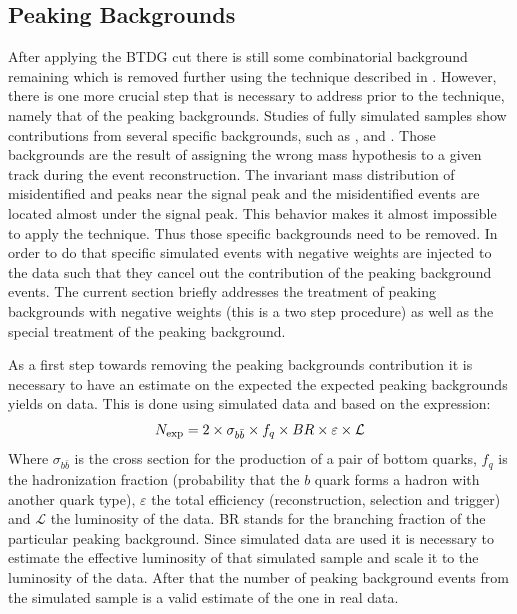 \subsection{Peaking Backgrounds}
\label{peaking_backgrounds}

After applying the BTDG cut there is still some combinatorial background remaining which is removed
further using the \sPlot technique described in . However, there is
one more crucial step that is necessary to address prior to the \sPlot technique, namely that of the peaking backgrounds.
Studies of fully simulated samples show contributions from several specific backgrounds, such as \BsJpsiKK, \BsJpsipipi and \BdJpsipipi.
Those backgrounds are the result of assigning the wrong mass hypothesis to a given track during the event reconstruction.  
The invariant mass distribution of misidentified \BdJpsipipi and \BsJpsipipi peaks near the \BsJpsiKpi signal peak
and the misidentified \BsJpsiKK events are located almost under the \BdJpsiKpi signal peak. 
This behavior makes it almost impossible to apply the \sPlot technique. Thus those specific backgrounds need to be removed. 
In order to do that specific simulated events with negative weights are injected to the data such that they cancel out the
contribution of the peaking background events. The current section briefly addresses the treatment of peaking backgrounds 
with negative weights (this is a two step procedure) as well as the special treatment of the \LbJpsippi peaking background.

As a first step towards removing the peaking backgrounds contribution it is necessary to have an estimate on the expected 
the expected peaking backgrounds yields on data. This is done using simulated data and based on the expression:
\begin{equation}
N_{\rm exp} = 2 \times \sigma_{b\bar{b}}\times f_q \times BR \times \varepsilon \times {\mathcal{L}}
\end{equation}
\noindent Where $\sigma_{b\bar{b}}$ is the cross section for the production of a pair of bottom quarks, $f_q$ is the hadronization fraction
(probability that the $b$ quark forms a hadron with another quark type), $\varepsilon$ the total efficiency (reconstruction, selection and trigger)
and ${\mathcal{L}}$ the luminosity of the data. BR stands for the branching fraction of the particular peaking background. Since simulated data are used
it is necessary to estimate the effective luminosity of that simulated sample and scale it to the luminosity of the data. After that the number of
peaking background events from the simulated sample is a valid estimate of the one in real data.


